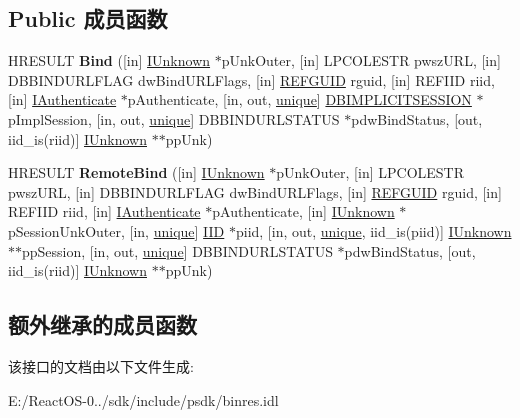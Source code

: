 \subsection*{Public 成员函数}
\begin{DoxyCompactItemize}
\item 
\mbox{\label{interface_i_bind_resource_a04cc080121492a11b82f9c114e1bd294}} 
H\+R\+E\+S\+U\+LT {\bfseries Bind} (\mbox{[}in\mbox{]} \hyperlink{interface_i_unknown}{I\+Unknown} $\ast$p\+Unk\+Outer, \mbox{[}in\mbox{]} L\+P\+C\+O\+L\+E\+S\+TR pwsz\+U\+RL, \mbox{[}in\mbox{]} D\+B\+B\+I\+N\+D\+U\+R\+L\+F\+L\+AG dw\+Bind\+U\+R\+L\+Flags, \mbox{[}in\mbox{]} \hyperlink{struct___g_u_i_d}{R\+E\+F\+G\+U\+ID} rguid, \mbox{[}in\mbox{]} R\+E\+F\+I\+ID riid, \mbox{[}in\mbox{]} \hyperlink{interface_i_authenticate}{I\+Authenticate} $\ast$p\+Authenticate, \mbox{[}in, out, \hyperlink{interfaceunique}{unique}\mbox{]} \hyperlink{structtag_d_b_i_m_p_l_i_c_i_t_s_e_s_s_i_o_n}{D\+B\+I\+M\+P\+L\+I\+C\+I\+T\+S\+E\+S\+S\+I\+ON} $\ast$p\+Impl\+Session, \mbox{[}in, out, \hyperlink{interfaceunique}{unique}\mbox{]} D\+B\+B\+I\+N\+D\+U\+R\+L\+S\+T\+A\+T\+US $\ast$pdw\+Bind\+Status, \mbox{[}out, iid\+\_\+is(riid)\mbox{]} \hyperlink{interface_i_unknown}{I\+Unknown} $\ast$$\ast$pp\+Unk)
\item 
\mbox{\label{interface_i_bind_resource_aea573a32be4a9d4420a82b21b4619099}} 
H\+R\+E\+S\+U\+LT {\bfseries Remote\+Bind} (\mbox{[}in\mbox{]} \hyperlink{interface_i_unknown}{I\+Unknown} $\ast$p\+Unk\+Outer, \mbox{[}in\mbox{]} L\+P\+C\+O\+L\+E\+S\+TR pwsz\+U\+RL, \mbox{[}in\mbox{]} D\+B\+B\+I\+N\+D\+U\+R\+L\+F\+L\+AG dw\+Bind\+U\+R\+L\+Flags, \mbox{[}in\mbox{]} \hyperlink{struct___g_u_i_d}{R\+E\+F\+G\+U\+ID} rguid, \mbox{[}in\mbox{]} R\+E\+F\+I\+ID riid, \mbox{[}in\mbox{]} \hyperlink{interface_i_authenticate}{I\+Authenticate} $\ast$p\+Authenticate, \mbox{[}in\mbox{]} \hyperlink{interface_i_unknown}{I\+Unknown} $\ast$p\+Session\+Unk\+Outer, \mbox{[}in, \hyperlink{interfaceunique}{unique}\mbox{]} \hyperlink{struct___i_i_d}{I\+ID} $\ast$piid, \mbox{[}in, out, \hyperlink{interfaceunique}{unique}, iid\+\_\+is(piid)\mbox{]} \hyperlink{interface_i_unknown}{I\+Unknown} $\ast$$\ast$pp\+Session, \mbox{[}in, out, \hyperlink{interfaceunique}{unique}\mbox{]} D\+B\+B\+I\+N\+D\+U\+R\+L\+S\+T\+A\+T\+US $\ast$pdw\+Bind\+Status, \mbox{[}out, iid\+\_\+is(riid)\mbox{]} \hyperlink{interface_i_unknown}{I\+Unknown} $\ast$$\ast$pp\+Unk)
\end{DoxyCompactItemize}
\subsection*{额外继承的成员函数}


该接口的文档由以下文件生成\+:\begin{DoxyCompactItemize}
\item 
E\+:/\+React\+O\+S-\/0../sdk/include/psdk/binres.\+idl\end{DoxyCompactItemize}
